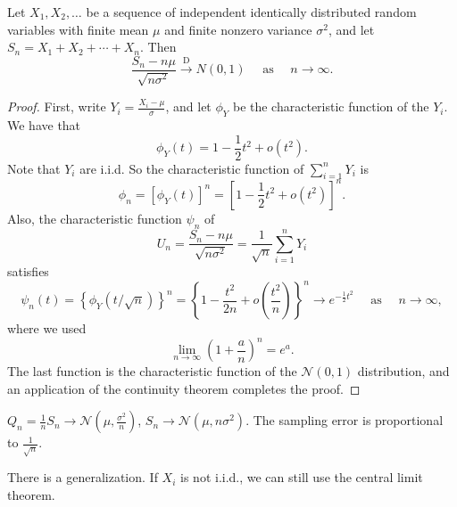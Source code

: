 \begin{theorem}
Let $X_1 , X_2, \dots$ be a sequence of independent identically distributed random variables with finite mean $\mu$ and finite nonzero variance $\sigma^2$, and let $S_n = X_1 + X_2 + \cdots + X_n$. Then
\begin{equation*}
    \frac{S_{n}-n \mu}{\sqrt{n \sigma^{2}}} \stackrel{\mathrm{D}}{\rightarrow} N(0,1) \quad \text { as } \quad n \rightarrow \infty.
\end{equation*}
\end{theorem}

\begin{proof}
First, write $Y_i = \frac{X_i - \mu}{\sigma}$, and let $\phi_Y$ be the characteristic function of the $Y_i$. We have that 
\begin{equation*}
    \phi_{Y}(t)=1-\frac{1}{2} t^{2}+o\left(t^{2}\right).
\end{equation*}
Note that $Y_i$ are i.i.d. So the characteristic function of $\sum_{i=1}^n Y_i$ is
\begin{equation*}
    \phi_n = [\phi_{Y}(t)]^n = \left[ 1-\frac{1}{2} t^{2}+o\left(t^{2}\right) \right]^n.
\end{equation*}
Also, the characteristic function $\psi_n$ of
\begin{equation*}
    U_{n}=\frac{S_{n}-n \mu}{\sqrt{n \sigma^{2}}}=\frac{1}{\sqrt{n}} \sum_{i=1}^{n} Y_{i}
\end{equation*}
satisfies
\begin{equation*}
    \psi_{n}(t)=\left\{\phi_{Y}(t / \sqrt{n})\right\}^{n}=\left\{1-\frac{t^{2}}{2 n}+o\left(\frac{t^{2}}{n}\right)\right\}^{n} \rightarrow e^{-\frac{1}{2} t^{2}} \quad \text { as } \quad  n \rightarrow \infty,
\end{equation*}
where we used 
\begin{equation*}
    \lim_{n\to\infty} \left( 1 + \frac{a}{n} \right)^n = e^a.
\end{equation*}
The last function is the characteristic function of the $\mathcal{N}(0, 1)$ distribution, and an application of the continuity theorem completes the proof.
\end{proof}

\begin{corollary}
$Q_n = \frac{1}{n}S_n \to \mathcal{N} \left(\mu, \frac{\sigma^2}{n} \right)$, $S_n \to \mathcal{N}(\mu, n \sigma^2)$. The sampling error is proportional to $\frac{1}{\sqrt{n}}$.
\end{corollary}
There is a generalization. If $X_i$ is not i.i.d., we can still use the central limit theorem.

